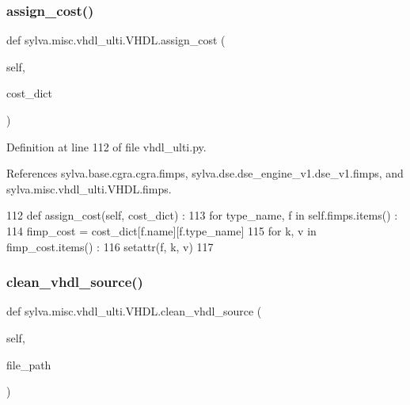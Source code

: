 \subsubsection{\texorpdfstring{assign\+\_\+cost()}{assign\_cost()}}
{\footnotesize\ttfamily def sylva.\+misc.\+vhdl\+\_\+ulti.\+V\+H\+D\+L.\+assign\+\_\+cost (\begin{DoxyParamCaption}\item[{}]{self,  }\item[{}]{cost\+\_\+dict }\end{DoxyParamCaption})}



Definition at line 112 of file vhdl\+\_\+ulti.\+py.



References sylva.\+base.\+cgra.\+cgra.\+fimps, sylva.\+dse.\+dse\+\_\+engine\+\_\+v1.\+dse\+\_\+v1.\+fimps, and sylva.\+misc.\+vhdl\+\_\+ulti.\+V\+H\+D\+L.\+fimps.


\begin{DoxyCode}
112   \textcolor{keyword}{def }assign\_cost(self, cost\_dict) :
113     \textcolor{keywordflow}{for} type\_name, f \textcolor{keywordflow}{in} self.fimps.items() :
114       fimp\_cost = cost\_dict[f.name][f.type\_name]
115       \textcolor{keywordflow}{for} k, v \textcolor{keywordflow}{in} fimp\_cost.items() :
116         setattr(f, k, v)
117 
\end{DoxyCode}
\mbox{\label{classsylva_1_1misc_1_1vhdl__ulti_1_1_v_h_d_l_a9069beffb43ba444c7aa61902dcff236}} 
\subsubsection{\texorpdfstring{clean\+\_\+vhdl\+\_\+source()}{clean\_vhdl\_source()}}
{\footnotesize\ttfamily def sylva.\+misc.\+vhdl\+\_\+ulti.\+V\+H\+D\+L.\+clean\+\_\+vhdl\+\_\+source (\begin{DoxyParamCaption}\item[{}]{self,  }\item[{}]{file\+\_\+path }\end{DoxyParamCaption})}



